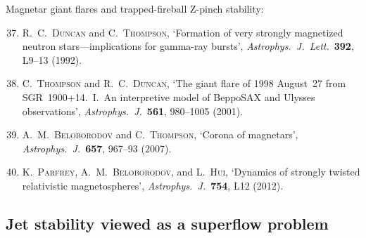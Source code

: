 \noindent
Magnetar giant flares and trapped-fireball Z-pinch stability:
\begin{enumerate}
\setcounter{enumi}{36}
\item R.~C.~\textsc{Duncan} and C.~\textsc{Thompson}, `Formation of
  very strongly magnetized neutron stars---implications for gamma-ray
  bursts', \emph{Astrophys.\ J.\ Lett.}\ \textbf{392}, L9--13 (1992).

\item C.~\textsc{Thompson} and R.~C.~\textsc{Duncan}, `The giant
  flare of 1998 August~27 from SGR~1900+14.\ I.\ An interpretive model
  of BeppoSAX and Ulysses observations', \emph{Astrophys.\ J.}\
  \textbf{561}, 980--1005 (2001).

\item A.~M.~\textsc{Beloborodov} and C.~\textsc{Thompson},
  `Corona of magnetars', \emph{Astrophys.\ J.}\ \textbf{657},
  967--93 (2007).

\item K.~\textsc{Parfrey}, A.~M.~\textsc{Beloborodov}, and
  L.~\textsc{Hui}, `Dynamics of strongly twisted relativistic
  magnetospheres', \emph{Astrophys.\ J.}\ \textbf{754}, L12 (2012).
\end{enumerate}

\subsection{Jet stability viewed as a superflow problem}
\label{sec:rel-12-superflow-stability}

